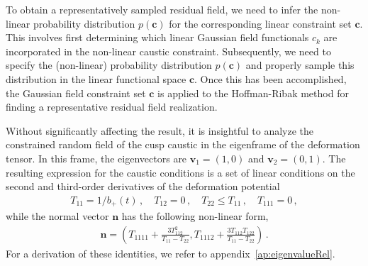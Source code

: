 \documentclass[a4paper, 11pt]{article}
\begin{document}
To obtain a representatively sampled residual field, we need to infer the non-linear probability distribution $p({\bm c})$ for the corresponding linear constraint set ${\bm c}$. This involves first
determining which linear Gaussian field functionals $c_k$ are incorporated in the non-linear caustic constraint. Subsequently, we need to specify the (non-linear) probability distribution $p({\bm c})$ and properly sample this distribution in the linear functional space ${\bm c}$. Once this has been accomplished, the Gaussian field constraint set ${\bm c}$ is applied to the Hoffman-Ribak method for finding a representative residual field realization.  

\bigskip
Without significantly affecting the result, it is insightful to analyze the constrained random field of the cusp caustic in the eigenframe of the deformation tensor. In this frame, the eigenvectors are $\bm{v}_1=(1,0)$ and $\bm{v}_2=(0,1)$.
The resulting expression for the caustic conditions is a set of linear conditions on the second and third-order derivatives of the deformation potential
\begin{align}
T_{11}=1/b_+(t)\,, \quad T_{12}=0\,,\quad T_{22}\leq T_{11}\,,\quad T_{111}=0\,,\label{eq:cusp_cond_1}
\end{align}
while the normal vector $\bm{n}$ has the following non-linear form, 
\begin{align}
\bm{n}=\left(T_{1111} + \frac{3T_{112}^2}{T_{11}-T_{22}}, T_{1112} + \frac{3T_{112}T_{122}}{T_{11}-T_{22}}\right)\,.\label{eq:cusp_cond_2}
\end{align}
For a derivation of these identities, we refer to appendix~\ref{ap:eigenvalueRel}.
\end{document}
